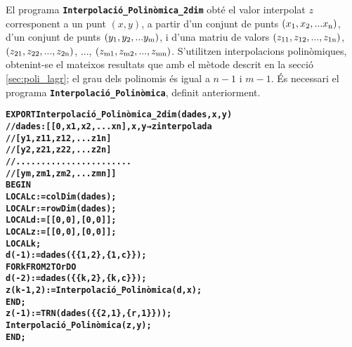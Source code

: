 El programa \texttt{\textbf{Interpolació\_Polinòmica\_2dim}} obté el valor interpolat $z$ corresponent a un punt $(x, y)$, a partir d'un conjunt de punts $(x_\mathrm{1}, x_\mathrm{2}, ... x_\mathrm{n})$, d'un conjunt de punts $(y_\mathrm{1}, y_\mathrm{2}, ... y_\mathrm{m})$, i d'una matriu de valors $(z_\mathrm{11}, z_\mathrm{12}, ..., z_\mathrm{1n})$,
$(z_\mathrm{21}, z_\mathrm{22}, ..., z_\mathrm{2n})$, ..., $(z_\mathrm{m1}, z_\mathrm{m2}, ..., z_\mathrm{mn})$. S'utilitzen  interpolacions polinòmiques, obtenint-se el mateixos resultats que amb el mètode descrit en la secció \vref{sec:poli_lagr}; el grau dels polinomis és igual a $n-1$ i $m-1$.
És necessari el programa \texttt{\textbf{Interpolació\_Polinòmica}}, definit anteriorment.
\vspace{-6mm}
\begin{alltt}
\bfseries
{}
    EXPORT Interpolació_Polinòmica_2dim(dades,x,y)
    // dades:[[0,   x1,  x2, ...  xn], x, y → z interpolada
    //        [y1, z11, z12, ... z1n]
    //        [y2, z21, z22, ... z2n]
    //        .......................
    //        [ym, zm1, zm2, ... zmn]]
    BEGIN
      LOCAL c:=colDim(dades);
      LOCAL r:=rowDim(dades);
      LOCAL d:=[[0,0],[0,0]];
      LOCAL z:=[[0,0],[0,0]];
      LOCAL k;
      d(-1):=dades(\{\{1,2\},\{1,c\}\});
      FOR k FROM 2 TO r DO
        d(-2):=dades(\{\{k,2\},\{k,c\}\});
        z(k-1,2):=Interpolació_Polinòmica(d,x);
      END;
      z(-1):=TRN(dades(\{\{2,1\},\{r,1\}\}));
      Interpolació_Polinòmica(z,y);
    END;
\end{alltt}
